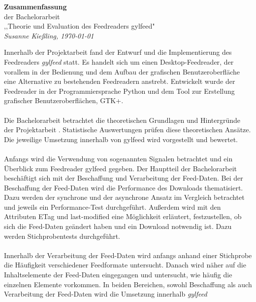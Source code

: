 \documentclass{scrartcl}
\begin{document}
\begin{center}
    \LARGE \textbf{Zusammenfassung} \\
    \vspace{.1in}
    \large der Bachelorarbeit \\
    \vspace{.1in}
    \small ,,Theorie und Evaluation des Feedreaders gylfeed" \\
    \vspace{.1in}
    \small \textit{Susanne Kießling, \today}
    \vspace{.2in}
\end{center}


Innerhalb der Projektarbeit \cite{kiessling} fand der Entwurf und die
Implementierung des Feedreaders \textit{gylfeed} statt. Es handelt sich um einen
Desktop-Feedreader, der vorallem in der Bedienung und dem Aufbau der grafischen
Benutzeroberfläche eine Alternative zu bestehenden Feedreadern anstrebt.
Entwickelt wurde der Feedreader in der Programmiersprache Python und dem Tool
zur Erstellung grafischer Benutzeroberflächen, GTK+.
\\
\\
Die Bachelorarbeit betrachtet die theoretischen Grundlagen und Hintergründe 
der Projektarbeit \cite{kiessling}. Statistische Auswertungen prüfen diese 
theoretischen Ansätze. Die jeweilige Umsetzung innerhalb von \textit{}gylfeed 
wird vorgestellt und bewertet.
\\
\\
Anfangs wird die Verwendung von sogenannten Signalen betrachtet und ein
Überblick zum Feedreader gylfeed gegeben. Der Hauptteil der Bachelorarbeit
beschäftigt sich mit der Beschaffung und Verarbeitung der Feed-Daten. Bei der
Beschaffung der Feed-Daten wird die Performance des Downloads thematisiert. Dazu
werden der synchrone und der asynchrone Ansatz im Vergleich betrachtet und jeweils
ein Performance-Test durchgeführt. Außerdem wird mit den Attributen ETag und
last-modified eine Möglichkeit erläutert, festzustellen, ob sich die Feed-Daten
geändert haben und ein Download notwendig ist. Dazu werden Stichprobentests
durchgeführt. 
\\
\\
Innerhalb der Verarbeitung der Feed-Daten wird anfangs anhand einer
Stichprobe die Häufigkeit verschiedener Feedformate untersucht. Danach wird
näher auf die Inhaltselemente der Feed-Daten eingegangen und untersucht, wie
häufig die einzelnen Elemente vorkommen. In beiden Bereichen, sowohl Beschaffung
als auch Verarbeitung der Feed-Daten wird die Umsetzung innerhalb \textit{gylfeed}
\end{document}
